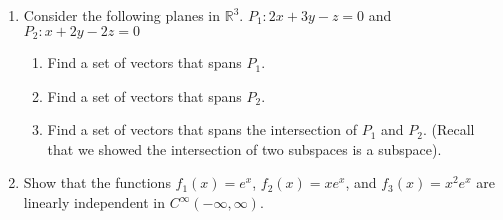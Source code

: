 \documentclass[12pt]{article}
\begin{document}
\begin{enumerate}
        \item Consider the following planes in $\mathbb{R}^3$. $P_1: 2x + 3y - z = 0$ and $P_2: x + 2y - 2z = 0$
              \begin{enumerate}
                      \item Find a set of vectors that spans $P_1$.
                      \item Find a set of vectors that spans $P_2$.
                      \item Find a set of vectors that spans the intersection of $P_1$ and $P_2$. (Recall that we showed the intersection of two subspaces is a subspace).
              \end{enumerate}

              \item Show that the functions $f_1(x) = e^x$, $f_2(x) = xe^x$, and $f_3(x) = x^2e^x$ are linearly independent in $C^{\infty}(-\infty, \infty)$.


\end{enumerate}
\end{document}
